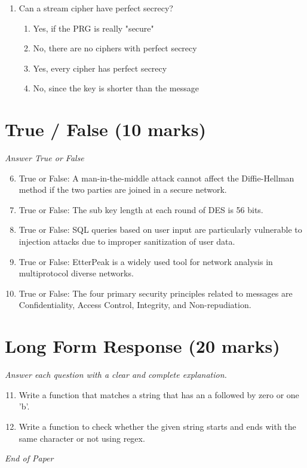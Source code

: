 \documentclass[12pt]{article}
\begin{document}
\begin{enumerate}[label=\arabic*.]
\begin{enumerate}[label=(\alph*)]
    \item Remove a subset of the constraints and retry the query.
\end{enumerate}
\item Can a stream cipher have perfect secrecy?
\begin{enumerate}[label=(\alph*)]
    \item Yes, if the PRG is really "secure"
    \item No, there are no ciphers with perfect secrecy
    \item Yes, every cipher has perfect secrecy
    \item No, since the key is shorter than the message
\end{enumerate}
\end{enumerate}

\section*{True / False (10 marks)}
\textit{Answer True or False}
\begin{enumerate}[label=\arabic*.]
\setcounter{enumi}{5}
\item True or False: A man-in-the-middle attack cannot affect the Diffie-Hellman method if the two parties are joined in a secure network.
\item True or False: The sub key length at each round of DES is 56 bits.
\item True or False: SQL queries based on user input are particularly vulnerable to injection attacks due to improper sanitization of user data.
\item True or False: EtterPeak is a widely used tool for network analysis in multiprotocol diverse networks.
\item True or False: The four primary security principles related to messages are Confidentiality, Access Control, Integrity, and Non-repudiation.
\end{enumerate}

\section*{Long Form Response (20 marks)}
\textit{Answer each question with a clear and complete explanation.}
\begin{enumerate}[label=\arabic*.]
\setcounter{enumi}{10}
\item Write a function that matches a string that has an a followed by zero or one 'b'.
\item Write a function to check whether the given string starts and ends with the same character or not using regex.
\end{enumerate}

\vfill
\noindent\textit{End of Paper}
\end{document}
